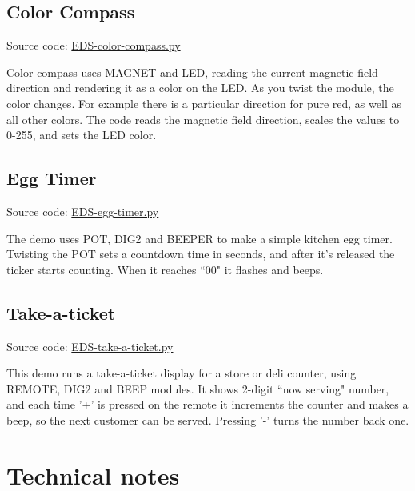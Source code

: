 \documentclass{article}
\begin{document}
\subsection{Color Compass}

Source code: \href{https://github.com/jamesbowman/i2cdriver/blob/master/python/samples/EDS-color-compass.py}{EDS-color-compass.py}

Color compass uses MAGNET and LED, reading the current magnetic field direction and rendering it as a color on the LED.
As you twist the module, the color changes.
For example there is a particular direction for pure red, as well as all other colors.
The code
reads the magnetic field direction, scales the values to 0-255, and sets the LED color.

\subsection{Egg Timer}

Source code: \href{https://github.com/jamesbowman/i2cdriver/blob/master/python/samples/EDS-egg-timer.py}{EDS-egg-timer.py}

The demo uses POT, DIG2 and BEEPER to make a simple kitchen egg timer.
Twisting the POT sets a countdown time in seconds,
and after it's released the ticker starts counting.
When it reaches ``00" it flashes and beeps.

\subsection{Take-a-ticket}

Source code: \href{https://github.com/jamesbowman/i2cdriver/blob/master/python/samples/EDS-take-a-ticket.py}{EDS-take-a-ticket.py}

This demo runs a take-a-ticket display for a store or deli counter,
using REMOTE, DIG2 and BEEP modules.
It shows 2-digit ``now serving" number, and each time '+' is
pressed on the remote it increments the counter and
makes a beep, so the next customer can be served.
Pressing '-' turns the number back one.

\newpage
\section{Technical notes}


\end{document}
